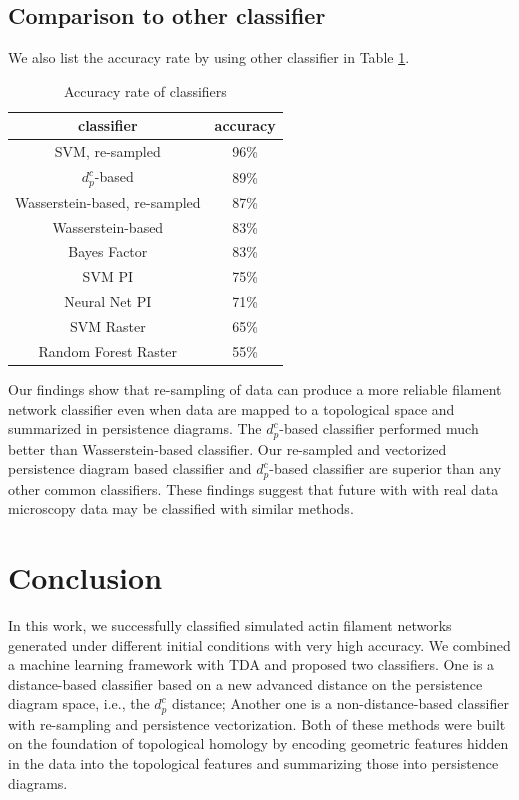 \documentclass[10pt]{article}
\begin{document}
\subsection{Comparison to other classifier}
We also list the accuracy rate by using other classifier in Table \ref{tab:accuracyrate}.
\begin{table}[!htb]
	\begin{center}
		\begin{tabular}{c|c}
			\hline
			\textbf{classifier} & \textbf{accuracy} \\
			\hline
			SVM, re-sampled & 96\%  \\
			\hline
			$d^c_p$-based & 89\%  \\
			\hline
			Wasserstein-based, re-sampled & 87\%  \\
			\hline
			Wasserstein-based & 83\%  \\
			\hline
			Bayes Factor \cite{maroulas2019bayesian} & 83\%  \\
			\hline
			SVM PI \cite{adams2017persistence} & 75\%  \\
			\hline
			Neural Net PI & 71\%  \\
			\hline
			SVM Raster & 65\%  \\
			\hline
			Random Forest Raster & 55\%  \\
			\hline
		\end{tabular}
		\caption{Accuracy rate of classifiers}\label{tab:accuracyrate}
	\end{center}
\end{table}

Our findings show that re-sampling of data can produce a more reliable filament network classifier even when data are mapped to a topological space and summarized in persistence diagrams. The $d^c_p$-based classifier performed much better than Wasserstein-based classifier. Our re-sampled and vectorized persistence diagram based classifier and $d^c_p$-based classifier are superior than any other common classifiers. These findings suggest that future with with real data microscopy data may be classified with similar methods.

\color{black}

\section{Conclusion}
In this work, we successfully classified simulated actin filament networks generated under different initial conditions with very high accuracy. We combined a machine learning framework with TDA and proposed two classifiers. One is a distance-based classifier based on a new advanced distance on the persistence diagram space, i.e., the $d^c_p$ distance; Another one is a non-distance-based classifier with re-sampling and persistence vectorization. Both of these methods were built on the foundation of topological homology by encoding geometric features hidden in the data into the topological features and summarizing those into persistence diagrams.
\end{document}
